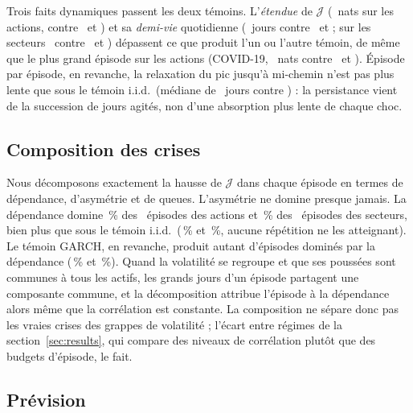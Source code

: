 \documentclass[12pt]{article}
\theoremstyle{definition}
\newcommand{\JJ}{\mathcal{J}}
\begin{document}
\begin{doublespace}
Trois faits dynamiques passent les deux témoins. L'\emph{étendue} de $\JJ$
(\qRangeSpObs~nats sur les actions, contre \qRangeSpIid\ et \qRangeSpFhs) et sa
\emph{demi-vie} quotidienne (\qHalfLifeSpObs\ jours contre \qHalfLifeSpIid\ et
\qHalfLifeSpFhs ; sur les secteurs \qHalfLifeFfObs\ contre \qHalfLifeFfIid\ et
\qHalfLifeFfFhs) dépassent ce que produit l'un ou l'autre témoin, de même que
le plus grand épisode sur les actions (COVID-19, \qMaxEpSpObs~nats contre
\qMaxEpSpIid\ et \qMaxEpSpFhs). Épisode par épisode, en revanche, la relaxation
du pic jusqu'à mi-chemin n'est pas plus lente que sous le témoin i.i.d.\
(médiane de \qEpHalfLifeSpObs\ jours contre \qEpHalfLifeSpIid) : la persistance
vient de la succession de jours agités, non d'une absorption plus lente de
chaque choc.

\subsection{Composition des crises}

Nous décomposons exactement la hausse de $\JJ$ dans chaque épisode en termes
de dépendance, d'asymétrie et de queues. L'asymétrie ne domine presque
jamais. La dépendance domine \qDepDomSpObs\,\% des \qEpUpSpObs\ épisodes des
actions et \qDepDomFfObs\,\% des \qEpUpFfObs\ épisodes des secteurs, bien plus
que sous le témoin i.i.d.\ (\qDepDomSpIid\,\% et \qDepDomFfIid\,\%, aucune
répétition ne les atteignant). Le témoin GARCH, en revanche, produit autant
d'épisodes dominés par la dépendance (\qDepDomSpFhs\,\% et \qDepDomFfFhs\,\%).
Quand la volatilité se regroupe et que ses poussées sont communes à tous les
actifs, les grands jours d'un épisode partagent une composante commune, et la
décomposition attribue l'épisode à la dépendance alors même que la corrélation
est constante. La composition ne sépare donc pas les vraies crises des grappes
de volatilité ; l'écart entre régimes de la section~\ref{sec:results}, qui
compare des niveaux de corrélation plutôt que des budgets d'épisode, le fait.

\subsection{Prévision}


\end{doublespace}
\end{document}
